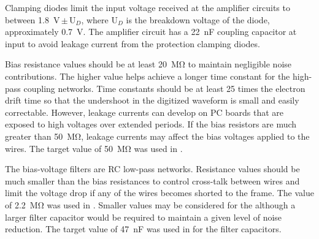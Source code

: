 

Clamping diodes limit the input voltage received at the amplifier circuits to between \SI{1.8}{V}\,$\pm$\,U$_D$, where U$_D$
is the breakdown voltage of the diode, approximately \SI{0.7}{V}.
The amplifier circuit has a \SI{22}{nF} coupling capacitor at input to avoid leakage current from the protection clamping diodes. 


Bias resistance values should be at least \SI{20}{\mega\ohm} to maintain negligible noise contributions.
The higher value helps achieve a longer time constant for the high-pass coupling networks.
Time constants should be at least \num{25} times the electron drift time so that the undershoot in the digitized waveform
is small and easily correctable.
However, leakage currents can develop on PC  boards that are exposed to high voltages over extended periods.
If the bias resistors are much greater than \SI{50}{\mega\ohm}, leakage currents may affect the bias voltages applied to the wires. The target value of \SI{50}{\mega\ohm} was used in .

The bias-voltage filters are RC low-pass networks.
Resistance values should be much smaller than the bias resistances to control cross-talk between wires
and limit the voltage drop if any of the wires becomes shorted to the  frame.
The value of \SI{2.2}{\mega\ohm} was used in .
Smaller values may be considered for %
the  although a larger filter capacitor would be required to maintain a given level of noise reduction.
The target value of \SI{47}{nF} was used in  for the filter capacitors.

